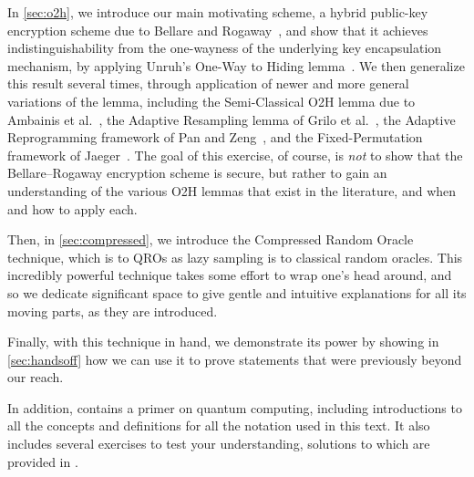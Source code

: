     In \autoref{sec:o2h}, we
      introduce our main motivating scheme, a hybrid public-key encryption
      scheme due to Bellare and Rogaway~\cite{CCS:BelRog93}, and show that it
      achieves indistinguishability from the one-wayness of the underlying key
      encapsulation mechanism, by applying Unruh's One-Way to Hiding
      lemma~\cite{ACM:Unruh14}. We then generalize this
      result several times, through application of newer and more general
      variations of the lemma, including the Semi-Classical O2H lemma due to
      Ambainis et al.~\cite{C:AmbHamUnr19}, the Adaptive Resampling lemma of
      Grilo et al.~\cite{AC:GHHM21}, the Adaptive Reprogramming framework of
      Pan and Zeng~\cite{PKC:PanZen24}, and the Fixed-Permutation framework of
      Jaeger~\cite{EPRINT:Jaeger24b}. The goal of this exercise, of course, is
      \emph{not} to show that the Bellare--Rogaway encryption scheme is secure,
      but rather to gain an understanding of the various O2H lemmas that exist
      in the literature, and when and how to apply each.

    Then, in \autoref{sec:compressed}, we introduce the Compressed Random
      Oracle technique, which is to QROs as lazy sampling is to classical
      random oracles.
      This incredibly powerful technique takes some effort to wrap one's head
      around, and so we dedicate significant space to give gentle and
      intuitive explanations for all its moving parts, as they are introduced.

    Finally, with this technique in hand, we demonstrate its power by showing 
      in \autoref{sec:handsoff} how we can use it to prove statements that were
      previously beyond our reach.

    In addition,  contains a primer on quantum computing,
      including introductions to all the concepts and definitions for all the
      notation used in this text. It also includes several exercises to test
      your understanding, solutions to which are provided in .
